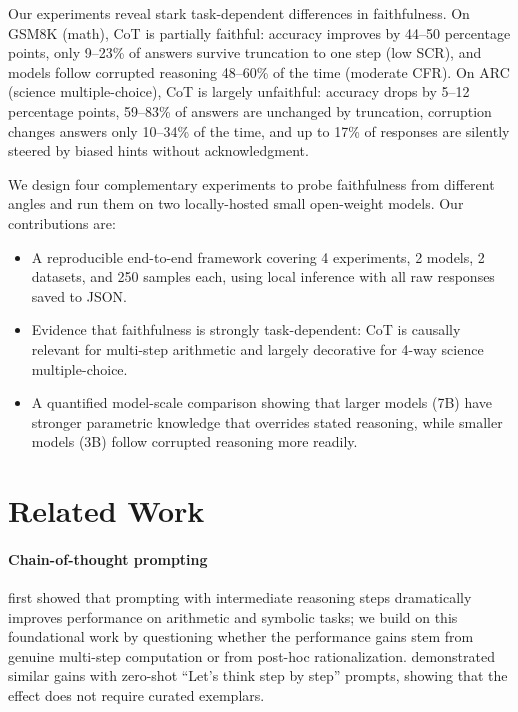\documentclass[11pt,twocolumn]{article}
\begin{document}
Our experiments reveal stark task-dependent differences in faithfulness. On
GSM8K (math), CoT is partially faithful: accuracy improves by 44--50
percentage points, only 9--23\% of answers survive truncation to one step
(low SCR), and models follow corrupted reasoning 48--60\% of the time
(moderate CFR). On ARC (science multiple-choice), CoT is largely unfaithful:
accuracy drops by 5--12 percentage points, 59--83\% of answers are unchanged
by truncation, corruption changes answers only 10--34\% of the time, and up
to 17\% of responses are silently steered by biased hints without
acknowledgment.

We design four complementary experiments to probe faithfulness from different
angles and run them on two locally-hosted small open-weight models. Our
contributions are:
\begin{itemize}
  \setlength\itemsep{0pt}
  \item A reproducible end-to-end framework covering 4 experiments, 2 models,
        2 datasets, and 250 samples each, using local inference with all raw
        responses saved to JSON.
  \item Evidence that faithfulness is strongly task-dependent: CoT is
        causally relevant for multi-step arithmetic and largely decorative
        for 4-way science multiple-choice.
  \item A quantified model-scale comparison showing that larger models (7B)
        have stronger parametric knowledge that overrides stated reasoning,
        while smaller models (3B) follow corrupted reasoning more readily.
\end{itemize}


\section{Related Work}

\paragraph{Chain-of-thought prompting}
\citet{wei2022chain} first showed that prompting with intermediate reasoning
steps dramatically improves performance on arithmetic and symbolic tasks; we
build on this foundational work by questioning whether the performance gains
stem from genuine multi-step computation or from post-hoc rationalization.
\citet{kojima2022large} demonstrated similar gains with zero-shot ``Let's
think step by step'' prompts, showing that the effect does not require curated
exemplars.
\end{document}
